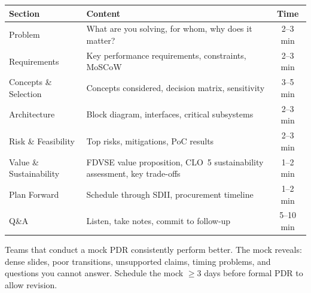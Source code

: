 \begin{center}\small
\begin{tabularx}{\textwidth}{lXc}
\toprule
\textbf{Section} & \textbf{Content} & \textbf{Time} \\
\midrule
Problem & What are you solving, for whom, why does it matter? & 2--3 min \\
Requirements & Key performance requirements, constraints, MoSCoW & 2--3 min \\
Concepts \& Selection & Concepts considered, decision matrix, sensitivity & 3--5 min \\
Architecture & Block diagram, interfaces, critical subsystems & 2--3 min \\
Risk \& Feasibility & Top risks, mitigations, PoC results & 2--3 min \\
Value \& Sustainability & FDVSE value proposition, CLO~5 sustainability assessment, key trade-offs & 1--2 min \\
Plan Forward & Schedule through SDII, procurement timeline & 1--2 min \\
Q\&A & Listen, take notes, commit to follow-up & 5--10 min \\
\bottomrule
\end{tabularx}
\end{center}

\begin{tipbox}
Teams that conduct a mock PDR consistently perform better. The mock reveals: dense slides, poor transitions, unsupported claims, timing problems, and questions you cannot answer. Schedule the mock $\geq$3 days before formal PDR to allow revision.
\end{tipbox}

